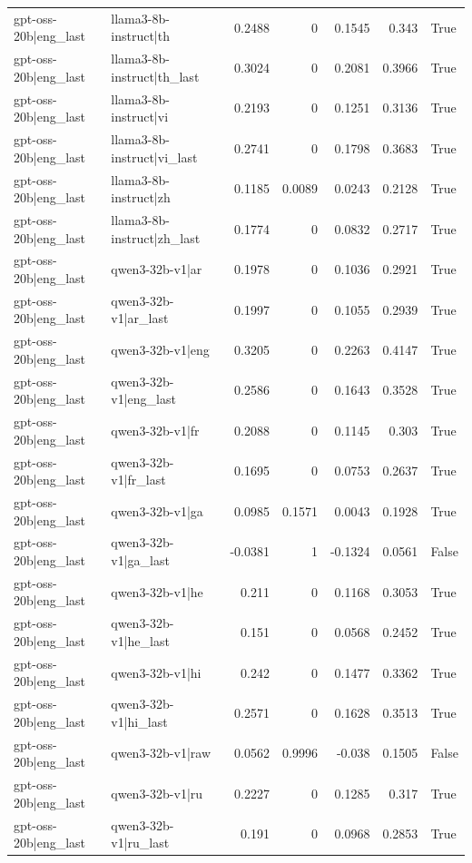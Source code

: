 \begin{table}
\begin{tabular}{l l r r r r l}
gpt-oss-20b|eng_last & llama3-8b-instruct|th & 0.2488 & 0 & 0.1545 & 0.343 & True \\
gpt-oss-20b|eng_last & llama3-8b-instruct|th_last & 0.3024 & 0 & 0.2081 & 0.3966 & True \\
gpt-oss-20b|eng_last & llama3-8b-instruct|vi & 0.2193 & 0 & 0.1251 & 0.3136 & True \\
gpt-oss-20b|eng_last & llama3-8b-instruct|vi_last & 0.2741 & 0 & 0.1798 & 0.3683 & True \\
gpt-oss-20b|eng_last & llama3-8b-instruct|zh & 0.1185 & 0.0089 & 0.0243 & 0.2128 & True \\
gpt-oss-20b|eng_last & llama3-8b-instruct|zh_last & 0.1774 & 0 & 0.0832 & 0.2717 & True \\
gpt-oss-20b|eng_last & qwen3-32b-v1|ar & 0.1978 & 0 & 0.1036 & 0.2921 & True \\
gpt-oss-20b|eng_last & qwen3-32b-v1|ar_last & 0.1997 & 0 & 0.1055 & 0.2939 & True \\
gpt-oss-20b|eng_last & qwen3-32b-v1|eng & 0.3205 & 0 & 0.2263 & 0.4147 & True \\
gpt-oss-20b|eng_last & qwen3-32b-v1|eng_last & 0.2586 & 0 & 0.1643 & 0.3528 & True \\
gpt-oss-20b|eng_last & qwen3-32b-v1|fr & 0.2088 & 0 & 0.1145 & 0.303 & True \\
gpt-oss-20b|eng_last & qwen3-32b-v1|fr_last & 0.1695 & 0 & 0.0753 & 0.2637 & True \\
gpt-oss-20b|eng_last & qwen3-32b-v1|ga & 0.0985 & 0.1571 & 0.0043 & 0.1928 & True \\
gpt-oss-20b|eng_last & qwen3-32b-v1|ga_last & -0.0381 & 1 & -0.1324 & 0.0561 & False \\
gpt-oss-20b|eng_last & qwen3-32b-v1|he & 0.211 & 0 & 0.1168 & 0.3053 & True \\
gpt-oss-20b|eng_last & qwen3-32b-v1|he_last & 0.151 & 0 & 0.0568 & 0.2452 & True \\
gpt-oss-20b|eng_last & qwen3-32b-v1|hi & 0.242 & 0 & 0.1477 & 0.3362 & True \\
gpt-oss-20b|eng_last & qwen3-32b-v1|hi_last & 0.2571 & 0 & 0.1628 & 0.3513 & True \\
gpt-oss-20b|eng_last & qwen3-32b-v1|raw & 0.0562 & 0.9996 & -0.038 & 0.1505 & False \\
gpt-oss-20b|eng_last & qwen3-32b-v1|ru & 0.2227 & 0 & 0.1285 & 0.317 & True \\
gpt-oss-20b|eng_last & qwen3-32b-v1|ru_last & 0.191 & 0 & 0.0968 & 0.2853 & True \\

\end{tabular}
\end{table}
